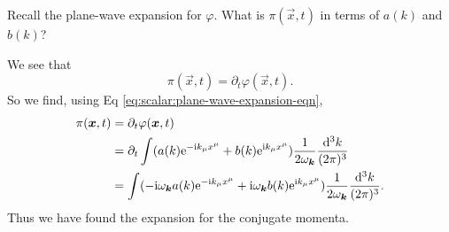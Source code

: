\begin{xca}
Recall  the plane-wave
expansion for $\varphi$. What is $\pi(\vec{x},t)$ in terms of $a(k)$ and $b(k)$?
\end{xca}
\begin{soln}
We see that
\begin{equation}
\pi(\vec{x},t)=\partial_{t}\varphi(\vec{x},t).
\end{equation}
So we find, using Eq \eqref{eq:scalar:plane-wave-expansion-eqn},
\begin{subequations}
\begin{align}
\pi(\vec{x},t)
&=\partial_{t}\varphi(\vec{x},t)\nonumber\\
&=\partial_{t}\int(a(k)\E^{-\I k_{\mu}x^{\mu}}+b(k)\E^{\I k_{\mu}x^{\mu}})\frac{1}{2\omega_{\vec{k}}}\frac{\D^{3}k}{(2\pi)^{3}}\\
&=\int(-\I\omega_{\vec{k}}a(k)\E^{-\I k_{\mu}x^{\mu}}+\I\omega_{\vec{k}}b(k)\E^{\I k_{\mu}x^{\mu}})\frac{1}{2\omega_{\vec{k}}}\frac{\D^{3}k}{(2\pi)^{3}}.
\end{align}
\end{subequations}
Thus we have found the expansion for the conjugate momenta.
\end{soln}

